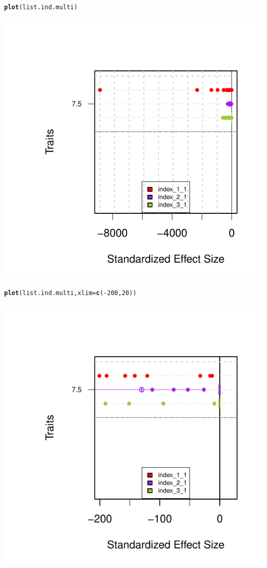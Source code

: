 \documentclass[12pt]{article}\usepackage[]{graphicx}\usepackage[]{color}
\makeatletter
\def\maxwidth{ %
  \ifdim\Gin@nat@width>\linewidth
    \linewidth
  \else
    \Gin@nat@width
  \fi
}
\newcommand{\hlnum}[1]{\textcolor[rgb]{0.686,0.059,0.569}{#1}}%
\newcommand{\hlopt}[1]{\textcolor[rgb]{0,0,0}{#1}}%
\newcommand{\hlstd}[1]{\textcolor[rgb]{0.345,0.345,0.345}{#1}}%
\newcommand{\hlkwc}[1]{\textcolor[rgb]{0.333,0.667,0.333}{#1}}%
\newcommand{\hlkwd}[1]{\textcolor[rgb]{0.737,0.353,0.396}{\textbf{#1}}}%
\newenvironment{kframe}{%
 \def\at@end@of@kframe{}%
 \ifinner\ifhmode%
  \def\at@end@of@kframe{\end{minipage}}%
  \begin{minipage}{\columnwidth}%
 \fi\fi%
 \def\FrameCommand##1{\hskip\@totalleftmargin \hskip-\fboxsep
 \colorbox{shadecolor}{##1}\hskip-\fboxsep
     \hskip-\linewidth \hskip-\@totalleftmargin \hskip\columnwidth}%
 \MakeFramed {\advance\hsize-\width
   \@totalleftmargin\z@ \linewidth\hsize
   \@setminipage}}%
 {\par\unskip\endMakeFramed%
 \at@end@of@kframe}
\newenvironment{knitrout}{}{} %
\makeatother
\begin{document}
\begin{knitrout}
\color{fgcolor}\begin{kframe}
\begin{alltt}
\hlkwd{plot}\hlstd{(list.ind.multi)}
\end{alltt}
\end{kframe}
\includegraphics[width=\maxwidth]{figure/unnamed-chunk-501} 
\begin{kframe}\begin{alltt}
\hlkwd{plot}\hlstd{(list.ind.multi,} \hlkwc{xlim}\hlstd{=}\hlkwd{c}\hlstd{(}\hlopt{-}\hlnum{200}\hlstd{,}\hlnum{20}\hlstd{))}
\end{alltt}
\end{kframe}
\includegraphics[width=\maxwidth]{figure/unnamed-chunk-502} 


\end{knitrout}
\end{document}
